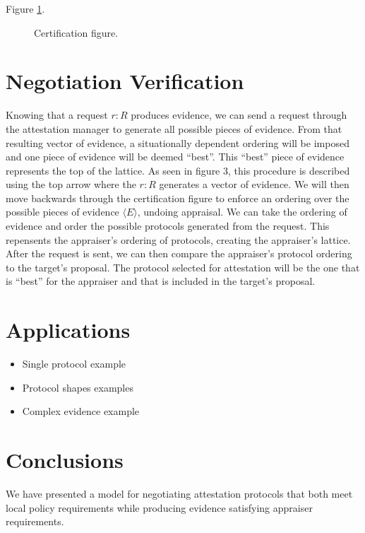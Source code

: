 \documentclass[sigconf,authordraft]{acmart}
\begin{document}
Figure \ref{fig:certification-fig}.

\begin{figure}[hbtp]
  \centering
  
  \caption[Attestation process]{Certification figure.}
  \label{fig:certification-fig}
\end{figure}


\section{Negotiation Verification}

Knowing that a request $r:R$ produces evidence, we can send a request through the attestation manager to generate all possible pieces of evidence. From that resulting vector of evidence, a situationally dependent ordering will be imposed and one piece of evidence will be deemed ``best''. This ``best'' piece of evidence represents the top of the lattice. As seen in figure 3, this procedure is described using the top arrow where the $r:R$ generates a vector of evidence. We will then move backwards through the certification figure to enforce an ordering over the possible pieces of evidence $\langle E \rangle$, undoing appraisal. We can take the ordering of evidence and order the possible protocols generated from the request. This repensents the appraiser's ordering of protocols, creating the appraiser's lattice. After the request is sent, we can then compare the appraiser's protocol ordering to the target's proposal. The protocol selected for attestation will be the one that is ``best'' for the appraiser and that is included in the target's proposal.      

\section{Applications}

\begin{itemize}
\item Single protocol example
\item Protocol shapes examples
\item Complex evidence example
\end{itemize}

\section{Conclusions}

We have presented a model for negotiating attestation protocols that
both meet local policy requirements while producing evidence
satisfying appraiser requirements.

\nocite{Coker::Principles-of-R,Ramsdell:2019aa,Petz:2019aa,Davey:02:Introduction-to}



\end{document}

